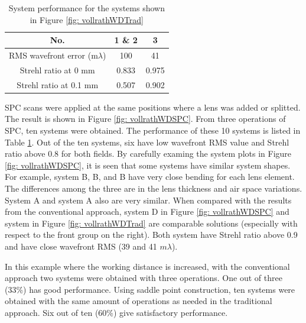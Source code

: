 \setlength{\arrayrulewidth}{.5mm}
\setlength{\tabcolsep}{18pt}
\renewcommand{\arraystretch}{1.2}
\begin{table}[h!]
    \centering
    \captionsetup{justification=centering}
    \caption{System performance for the systems shown in Figure \ref{fig: vollrathWDTrad}}
    \label{table: vollrathWDTrad}
    \vspace{-1em}
    \begin{adjustbox}{max width=\textwidth, center}
    \begin{tabular}{c c c}
    \hline 
     No. & \textbf{1 \& 2} & \textbf{3}  \\ 
     \midrule
    RMS wavefront error (m$\lambda$) & 100 & 41 \\ 
    Strehl ratio at 0 mm & 0.833 & 0.975 \\
    Strehl ratio at 0.1 mm & 0.507 & 0.902 \\
    \hline
    \end{tabular}
    \end{adjustbox}
\end{table}

SPC scans were applied at the same positions where a lens was added or splitted. The result is shown in Figure \ref{fig: vollrathWDSPC}. From three operations of SPC, ten systems were obtained. The performance of these 10 systems is listed in Table \ref{table: vollrathWDTrad}. Out of the ten systems, six have low wavefront RMS value and Strehl ratio above 0.8 for both fields. By carefully examing the system plots in Figure \ref{fig: vollrathWDSPC}, it is seen that some systems have similar system shapes. For example, system B, B, and B have very close bending for each lens element. The differences among the three are in the lens thickness and air space variations. System A and system A also are very similar. When compared with the results from the conventional approach, system D in Figure \ref{fig: vollrathWDSPC} and system  in Figure \ref{fig: vollrathWDTrad} are comparable solutions (especially with respect to the front group on the right). Both system have Strehl ratio above 0.9 and have close wavefront RMS (39 and 41 $m\lambda$).

In this example where the working distance is increased, with the conventional approach two systems were obtained with three operations. One out of three (33\%) has good performance. Using saddle point construction, ten systems were obtained with the same amount of operations as needed in the traditional approach. Six out of ten (60\%) give satisfactory performance. 

